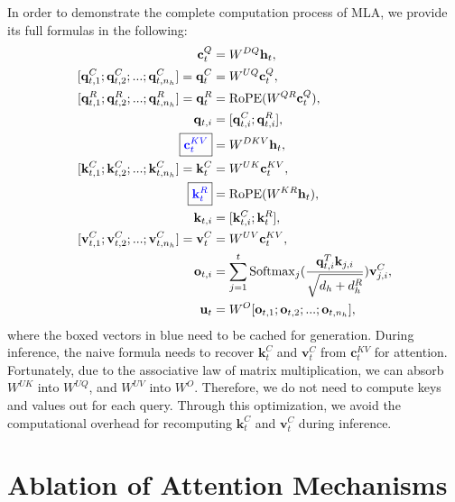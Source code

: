 \documentclass[11pt, a4paper, logo, copyright, nonumbering]{deepseek}
\newcommand{\dsattn}{MLA}
\begin{document}
\begin{CJK*}{UTF8}{gbsn}
In order to demonstrate the complete computation process of \dsattn{}, we provide its full formulas in the following: 
\begin{align}
    \mathbf{c}_{t}^{Q} &= W^{DQ} \mathbf{h}_{t}, \\
    [\mathbf{q}_{t, 1}^{C};\mathbf{q}_{t, 2}^{C};...;\mathbf{q}_{t, n_{h}}^{C}] = \mathbf{q}_{t}^{C} &= W^{UQ} \mathbf{c}_{t}^{Q}, \\
    [\mathbf{q}_{t, 1}^{R};\mathbf{q}_{t, 2}^{R};...;\mathbf{q}_{t, n_{h}}^{R}] = \mathbf{q}_{t}^{R} &= \operatorname{RoPE}({W^{QR}} \mathbf{c}_{t}^{Q}), \\
    \mathbf{q}_{t, i} &= [\mathbf{q}_{t, i}^{C}; \mathbf{q}_{t, i}^{R}], \\
    \boxed{\color{blue} \mathbf{c}_{t}^{KV}} &= W^{DKV} \mathbf{h}_{t}, \\
    [\mathbf{k}_{t, 1}^{C};\mathbf{k}_{t, 2}^{C};...;\mathbf{k}_{t, n_{h}}^{C}] = \mathbf{k}_{t}^{C} &= W^{UK} \mathbf{c}_{t}^{KV}, \\
    \boxed{\color{blue}\mathbf{k}_{t}^{R}} &= \operatorname{RoPE}({W^{KR}} \mathbf{h}_{t}), \\
    \mathbf{k}_{t, i} &= [\mathbf{k}_{t, i}^{C}; \mathbf{k}_{t}^{R}], \\
    [\mathbf{v}_{t, 1}^{C};\mathbf{v}_{t, 2}^{C};...;\mathbf{v}_{t, n_{h}}^{C}] = \mathbf{v}_{t}^{C} &= W^{UV} \mathbf{c}_{t}^{KV}, \\
    \mathbf{o}_{t, i} &= \sum_{j=1}^{t} \operatorname{Softmax}_j(\frac{\mathbf{q}_{t, i}^T \mathbf{k}_{j, i}}{\sqrt{d_{h} + d_{h}^{R}}}) \mathbf{v}_{j, i}^{C}, \\
    \mathbf{u}_{t} &= W^{O} [\mathbf{o}_{t, 1};\mathbf{o}_{t, 2};...;\mathbf{o}_{t, n_{h}}],
\end{align}
where the boxed vectors in blue need to be cached for generation. 
During inference, the naive formula needs to recover $\mathbf{k}_{t}^{C}$ and $\mathbf{v}_{t}^{C}$ from $\mathbf{c}_{t}^{KV}$ for attention. 
Fortunately, due to the associative law of matrix multiplication, we can absorb $W^{UK}$ into $W^{UQ}$, and $W^{UV}$ into $W^{O}$. 
Therefore, we do not need to compute keys and values out for each query. 
Through this optimization, we avoid the computational overhead for recomputing $\mathbf{k}_{t}^{C}$ and $\mathbf{v}_{t}^{C}$ during inference. 

\section{Ablation of Attention Mechanisms}


\end{CJK*}
\end{document}
